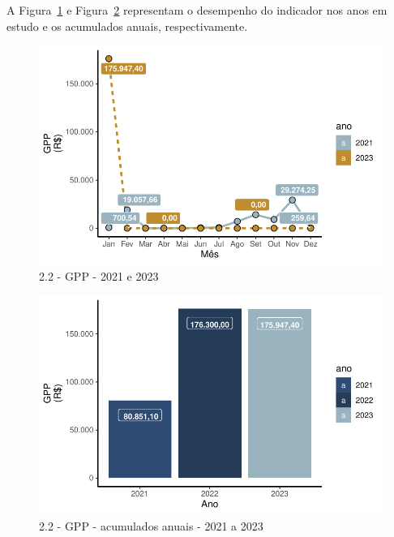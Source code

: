 \documentclass[
  a4paper,
  DIV=11,
  numbers=noendperiod]{scrartcl}
\begin{document}
A Figura~\ref{fig-ggpp} e Figura~\ref{fig-ggppac} representam o
desempenho do indicador nos anos em estudo e os acumulados anuais,
respectivamente.

\begin{figure}[H]

{\centering \includegraphics{relatorio_2023_files/figure-pdf/fig-ggpp-1.pdf}

}

\caption{\label{fig-ggpp}2.2 - GPP - 2021 e 2023}

\end{figure}

\begin{figure}[H]

{\centering \includegraphics{relatorio_2023_files/figure-pdf/fig-ggppac-1.pdf}

}

\caption{\label{fig-ggppac}2.2 - GPP - acumulados anuais - 2021 a 2023}

\end{figure}
\end{document}
